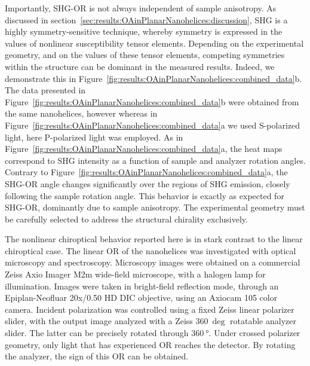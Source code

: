 Importantly, SHG-OR is not always independent of sample anisotropy. As discussed in section~\ref{sec:results:OAinPlanarNanohelices:discussion}, SHG is a highly symmetry-sensitive technique, whereby symmetry is expressed in the values of nonlinear susceptibility tensor elements. Depending on the experimental geometry, and on the values of these tensor elements, competing symmetries within the structure can be dominant in the measured results. Indeed, we demonstrate this in Figure~\ref{fig:results:OAinPlanarNanohelices:combined_data}b. The data presented in Figure~\ref{fig:results:OAinPlanarNanohelices:combined_data}b were obtained from the same nanohelices, however whereas in Figure~\ref{fig:results:OAinPlanarNanohelices:combined_data}a we used S-polarized light, here P-polarized light was employed. As in Figure~\ref{fig:results:OAinPlanarNanohelices:combined_data}a, the heat maps correspond to SHG intensity as a function of sample and analyzer rotation angles. Contrary to Figure~\ref{fig:results:OAinPlanarNanohelices:combined_data}a, the SHG-OR angle changes significantly over the regions of SHG emission, closely following the sample rotation angle. This behavior is exactly as expected for SHG-OR, dominantly due to sample anisotropy. The experimental geometry must be carefully selected to address the structural chirality exclusively.

The nonlinear chiroptical behavior reported here is in stark contrast to the linear chiroptical case. The linear OR of the nanohelices was investigated with optical microscopy and spectroscopy. 
Microscopy images were obtained on a commercial Zeiss Axio Imager M2m wide-field microscope, with a halogen lamp for illumination. Images were taken in bright-field reflection mode, through an Epiplan-Neofluar 20x/0.50 HD DIC objective, using an Axiocam 105 color camera. Incident polarization was controlled using a fixed Zeiss linear polarizer slider, with the output image analyzed with a Zeiss $\SI{360}{\deg}$ rotatable analyzer slider. 
The latter can be precisely rotated through $\SI{360}{\degree}$. Under crossed polarizer geometry, only light that has experienced OR reaches the detector. By rotating the analyzer, the sign of this OR can be obtained. 


